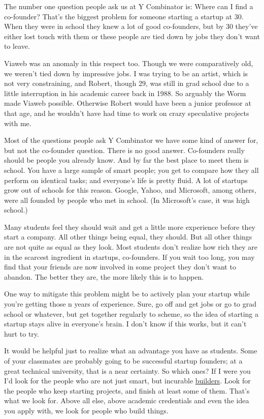 The number one question people ask us at Y Combinator is: Where can I
find a co-founder? That's the biggest problem for someone starting a
startup at 30. When they were in school they knew a lot of good
co-founders, but by 30 they've either lost touch with them or these
people are tied down by jobs they don't want to leave.

Viaweb was an anomaly in this respect too. Though we were comparatively
old, we weren't tied down by impressive jobs. I was trying to be an
artist, which is not very constraining, and Robert, though 29, was still
in grad school due to a little interruption in his academic career back
in 1988. So arguably the Worm made Viaweb possible. Otherwise Robert
would have been a junior professor at that age, and he wouldn't have had
time to work on crazy speculative projects with me.

Most of the questions people ask Y Combinator we have some kind of
answer for, but not the co-founder question. There is no good answer.
Co-founders really should be people you already know. And by far the
best place to meet them is school. You have a large sample of smart
people; you get to compare how they all perform on identical tasks; and
everyone's life is pretty fluid. A lot of startups grow out of schools
for this reason. Google, Yahoo, and Microsoft, among others, were all
founded by people who met in school. (In Microsoft's case, it was high
school.)

Many students feel they should wait and get a little more experience
before they start a company. All other things being equal, they should.
But all other things are not quite as equal as they look. Most students
don't realize how rich they are in the scarcest ingredient in startups,
co-founders. If you wait too long, you may find that your friends are
now involved in some project they don't want to abandon. The better they
are, the more likely this is to happen.

One way to mitigate this problem might be to actively plan your startup
while you're getting those n years of experience. Sure, go off and get
jobs or go to grad school or whatever, but get together regularly to
scheme, so the idea of starting a startup stays alive in everyone's
brain. I don't know if this works, but it can't hurt to try.

It would be helpful just to realize what an advantage you have as
students. Some of your classmates are probably going to be successful
startup founders; at a great technical university, that is a near
certainty. So which ones? If I were you I'd look for the people who are
not just smart, but incurable
\href{http://my-computer.cruftlabs.com:8080/photos/motorcouch/0067.html}{builders}.
Look for the people who keep starting projects, and finish at least some
of them. That's what we look for. Above all else, above academic
credentials and even the idea you apply with, we look for people who
build things.

